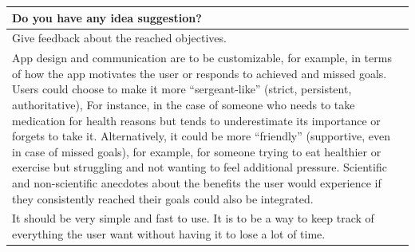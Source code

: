 \documentclass{article}
\begin{document}
\begin{table}[H]
	\centering
	\begin{tabularx}{0.9\textwidth}{X}
		\hline
		\textbf{Do you have any idea suggestion?}                                                                                                                                                                                                                                                                                                                                                                                                                                                                                                                                                                                                                                                                                                                                    \\
		\hline
		Give feedback about the reached objectives.                                                                                                                                                                                                                                                                                                                                                                                                                                                                                                                                                                                                                                                                                                                                  \\
		\hline
		App design and communication are to be customizable, for example, in terms of how the app motivates the user or responds to achieved and missed goals. Users could choose to make it more “sergeant-like” (strict, persistent, authoritative), For instance, in the case of someone who needs to take medication for health reasons but tends to underestimate its importance or forgets to take it. Alternatively, it could be more “friendly” (supportive, even in case of missed goals), for example, for someone trying to eat healthier or exercise but struggling and not wanting to feel additional pressure. Scientific and non-scientific anecdotes about the benefits the user would experience if they consistently reached their goals could also be integrated. \\
		\hline
		It should be very simple and fast to use. It is to be a way to keep track of everything the user want without having it to lose a lot of time.                                                                                                                                                                                                                                                                                                                                                                                                                                                                                                                                                                                                                               \\

\end{tabularx}
\end{table}
\end{document}
